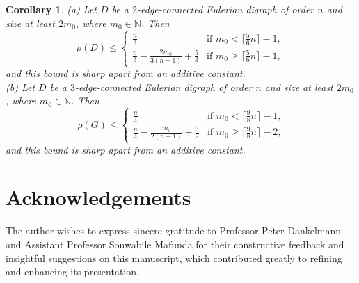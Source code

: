 \documentclass[a4paper,11pt]{article}
\newtheorem{corollary}[theorem]%
{Corollary}
\begin{document}
\begin{corollary}
(a) Let $ D $ be a $2$-edge-connected Eulerian digraph of order $ n $ and size at least $ 2m_{0} $, where $m_0 \in \mathbb{N}$. Then
\[ \rho(D) \leq \left\{ \begin{array}{cc}
   \frac{n}{3} & \textrm{if $m_0 <\lceil \frac{5}{6}n \rceil -1$,} \\
   \frac{n}{3} - \frac{2m_0}{3(n-1)} +\frac{5}{3} 
         & \textrm{if $m_0  \geq \lceil \frac{5}{6}n \rceil -1$},
      \end{array} \right. \]
and this bound is sharp apart from an additive constant. \\
(b) Let $ D $ be a $3$-edge-connected Eulerian digraph of order $ n $ and size at least $ 2m_{0} $, where $m_0 \in \mathbb{N}$. Then
\[ \rho(G) \leq \left\{ \begin{array}{cc}
   \frac{n}{4} & \textrm{if $m_0 < \lceil \frac{9}{8}n\rceil -1$,} \\
   \frac{n}{4} - \frac{m_0}{2(n-1)} + \frac{3}{2} 
        & \textrm{if $m_0 \geq \lceil \frac{9}{8}n\rceil -2$,}
      \end{array} \right. \]
and this bound is sharp apart from an additive constant. 
\end{corollary}




\section*{Acknowledgements}
The author wishes to express sincere gratitude to Professor Peter Dankelmann and Assistant Professor Sonwabile Mafunda for their constructive feedback and insightful suggestions on this manuscript, which contributed greatly to refining and enhancing its presentation.
\end{document}
